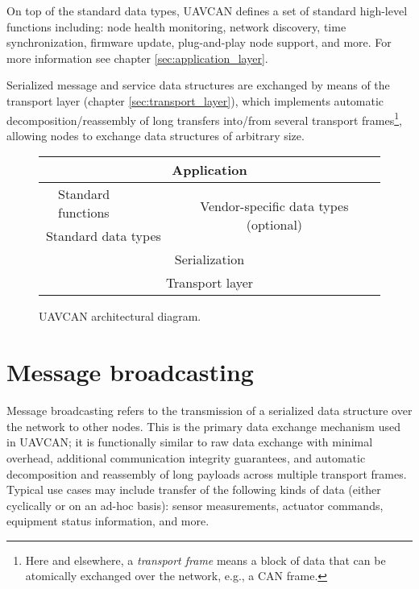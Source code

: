 On top of the standard data types, UAVCAN defines a set of standard high-level functions including:
node health monitoring, network discovery, time synchronization, firmware update,
plug-and-play node support, and more.
For more information see chapter \ref{sec:application_layer}.

Serialized message and service data structures are exchanged by means of the transport
layer (chapter \ref{sec:transport_layer}),
which implements automatic decomposition/reassembly of long transfers into/from several transport
frames\footnote{Here and elsewhere, a \emph{transport frame} means a block of data
that can be atomically exchanged over the network, e.g., a CAN frame.},
allowing nodes to exchange data structures of arbitrary size.

\begin{figure}[hbt]
    \centering
    \setlength\arrayrulewidth{1pt}  %
    \begin{tabularx}{0.8\textwidth}{|X|X|X|X|}
        \hline
        \multicolumn{4}{|c|}{Application} \\
        \hline

        & Standard functions & \multicolumn{2}{c|}{\multirow{3}{*}{Vendor-specific data types (optional)}} \\\cline{2-2}
        \multicolumn{2}{|c|}{\multirow{2}{*}{Standard data types}} & \multicolumn{2}{c|}{} \\
        \multicolumn{2}{|c|}{} & \multicolumn{2}{c|}{} \\

        \hline
        \multicolumn{4}{|c|}{Serialization} \\
        \hline
        \multicolumn{4}{|c|}{Transport layer} \\
        \hline
    \end{tabularx}
    \caption{UAVCAN architectural diagram.\label{fig:architecture}}
\end{figure}

\section{Message broadcasting}

Message broadcasting refers to the transmission of a serialized data structure over the network to other nodes.
This is the primary data exchange mechanism used in UAVCAN;
it is functionally similar to raw data exchange with minimal overhead,
additional communication integrity guarantees, and automatic decomposition and reassembly of long payloads
across multiple transport frames.
Typical use cases may include transfer of the following kinds of data (either cyclically or on an ad-hoc basis):
sensor measurements, actuator commands, equipment status information, and more.

